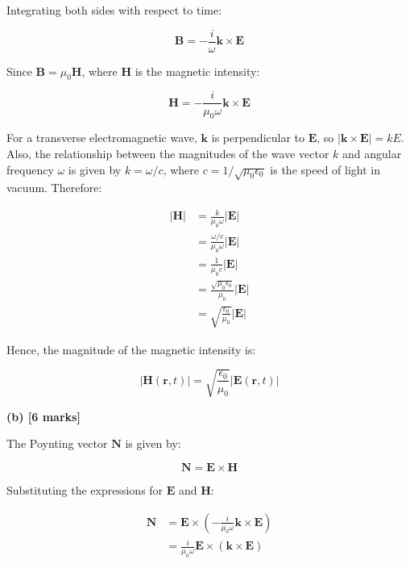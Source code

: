 \documentclass{article}
\begin{document}
Integrating both sides with respect to time:

\begin{equation*}
\mathbf{B} = -\frac{i}{\omega} \mathbf{k} \times \mathbf{E}
\end{equation*}

Since $\mathbf{B} = \mu_0 \mathbf{H}$, where $\mathbf{H}$ is the magnetic intensity:

\begin{equation*}
\mathbf{H} = -\frac{i}{\mu_0 \omega} \mathbf{k} \times \mathbf{E}
\end{equation*}

For a transverse electromagnetic wave, $\mathbf{k}$ is perpendicular to $\mathbf{E}$, so $|\mathbf{k} \times \mathbf{E}| = kE$. Also, the relationship between the magnitudes of the wave vector $k$ and angular frequency $\omega$ is given by $k = \omega/c$, where $c = 1/\sqrt{\mu_0 \epsilon_0}$ is the speed of light in vacuum. Therefore:

\begin{align*}
|\mathbf{H}| &= \frac{k}{\mu_0 \omega} |\mathbf{E}| \\
&= \frac{\omega / c}{\mu_0 \omega} |\mathbf{E}| \\
&= \frac{1}{\mu_0 c} |\mathbf{E}| \\
&= \frac{\sqrt{\mu_0 \epsilon_0}}{\mu_0} |\mathbf{E}| \\
&= \sqrt{\frac{\epsilon_0}{\mu_0}} |\mathbf{E}|
\end{align*}

Hence, the magnitude of the magnetic intensity is:

\begin{equation*}
|\mathbf{H}(\mathbf{r}, t)| = \sqrt{\frac{\epsilon_0}{\mu_0}} |\mathbf{E}(\mathbf{r}, t)|
\end{equation*}

\textbf{(b) [6 marks]}

The Poynting vector $\mathbf{N}$ is given by:

\begin{equation*}
\mathbf{N} = \mathbf{E} \times \mathbf{H}
\end{equation*}

Substituting the expressions for $\mathbf{E}$ and $\mathbf{H}$:

\begin{align*}
\mathbf{N} &= \mathbf{E} \times \left( -\frac{i}{\mu_0 \omega} \mathbf{k} \times \mathbf{E} \right) \\
&= \frac{i}{\mu_0 \omega} \mathbf{E} \times (\mathbf{k} \times \mathbf{E})
\end{align*}
\end{document}
